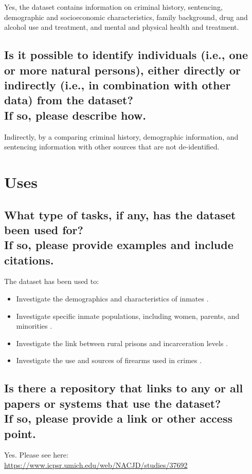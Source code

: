 \documentclass[letterpaper, 10 pt, conference]{ieeeconf}  %
\newcommand{\subtitle}[1]{{\\ \small \normalfont \color{purple} #1}}
\begin{document}
Yes, the dataset contains information on criminal history, sentencing, demographic and socioeconomic characteristics, family background, drug and alcohol use and treatment, and mental and physical health and treatment.


\subsection{Is it possible to identify individuals (i.e., one or more natural persons), either directly or indirectly (i.e., in combination with other data) from the dataset? \subtitle{If so, please describe how.}}

Indirectly, by a comparing criminal history, demographic information, and sentencing information with other sources that are not de-identified. 

\section{Uses}

\subsection{What type of tasks, if any, has the dataset been used for? \subtitle{If so, please provide examples and include citations.}}

The dataset has been used to:

\begin{itemize}
\item Investigate the demographics and characteristics of inmates \cite{peterson1981commits}.
    \item Investigate specific inmate populations, including women, parents, and minorities \cite{snell1994women, maruschak2021parents}.
    \item Investigate the link between rural prisons and incarceration levels \cite{porter2017correctional}.
    \item Investigate the use and sources of firearms used in crimes \cite{alper2019source}.
\end{itemize}


\subsection{Is there a repository that links to any or all papers or systems that use the dataset? \subtitle{If so, please provide a link or other access point. }}

Yes. Please see here: \\
\href{https://www.icpsr.umich.edu/web/NACJD/studies/37692}{https://www.icpsr.umich.edu/web/NACJD/studies/37692}
\end{document}
